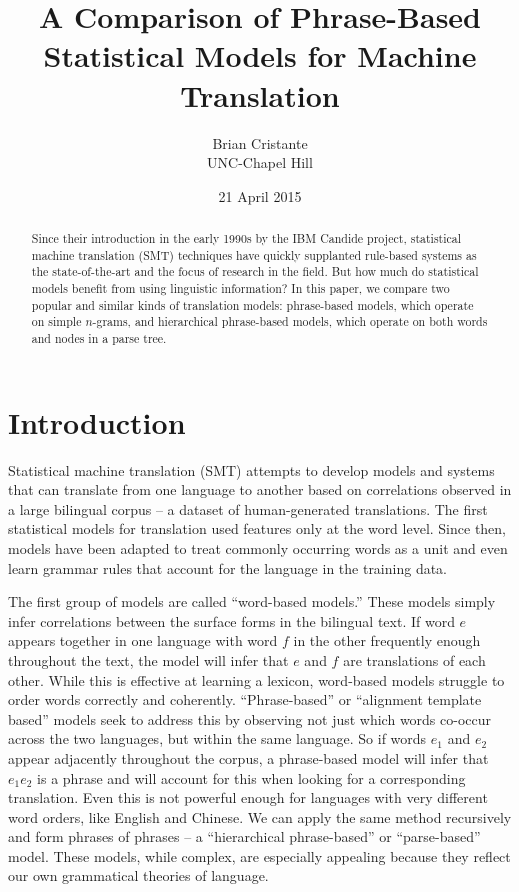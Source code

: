 \documentclass[11pt]{article}
\title{A Comparison of Phrase-Based Statistical Models for Machine Translation}
\author{Brian Cristante \\
  UNC-Chapel Hill}
\date{21 April 2015}
\begin{document}
\maketitle
\begin{abstract}
    Since their introduction in the early 1990s by the IBM Candide project, 
    statistical machine translation (SMT)
    techniques have quickly supplanted rule-based systems as the state-of-the-art
    and the focus of research in the field. But how much do statistical models benefit
    from using linguistic information? In this paper, we compare
    two popular and similar kinds of translation models: phrase-based models, 
    which operate on simple $n$-grams, and hierarchical phrase-based models, 
    which operate on both words and nodes in a parse tree.
\end{abstract}

\section{Introduction}
Statistical machine translation (SMT) attempts to develop models and systems
that can translate from one language to another based on correlations observed
in a large bilingual corpus -- a dataset of human-generated translations.
The first statistical models for translation used features
only at the word level. Since then, models have been adapted to
treat commonly occurring words as a unit
and even learn grammar rules that account for the language in the training data.

The first group of models are called ``word-based models.'' These models simply infer
correlations between the surface forms in the bilingual text. If word $e$ appears together in one language
with word $f$ in the other frequently enough throughout the text, the model will infer that
$e$ and $f$ are translations of each other. While this is effective at learning a lexicon, word-based models struggle to order words
correctly and coherently. ``Phrase-based'' or ``alignment template based'' models seek to address this
by observing not just which words co-occur across the two languages, but within the same language.
So if words $e_1$ and $e_2$ appear adjacently throughout the corpus, a phrase-based model will
infer that $e_1 e_2$ is a phrase and will account for this when looking for a corresponding translation.
Even this is not powerful enough for languages with very different word orders, like English and Chinese.
We can apply the same method recursively and form phrases of phrases -- a ``hierarchical phrase-based''
or ``parse-based'' model. These models, while complex, are especially appealing because they reflect
our own grammatical theories of language.
\end{document}
